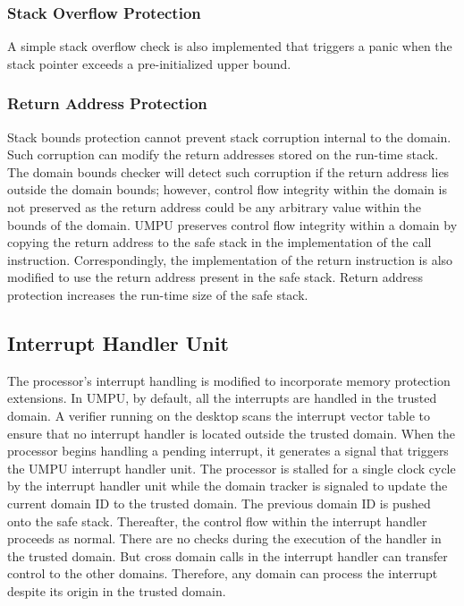 \subsubsection{Stack Overflow Protection}
A simple stack overflow check is also implemented that
triggers a panic when the stack pointer exceeds a pre-initialized
upper bound.
\subsubsection{Return Address Protection}
%
Stack bounds protection cannot prevent stack corruption internal to the domain.
%
Such corruption can modify the return addresses stored on the run-time stack.
%
The domain bounds checker will detect such corruption if the return address lies outside the domain bounds;
%
however, control flow integrity within the domain is not preserved as
the return address could be any arbitrary value within the bounds of
the domain.
%
UMPU preserves control flow integrity within a domain by copying the
return address to the safe stack in the implementation of the call
instruction.
%
Correspondingly, the implementation of the return instruction is also
modified to use the return address present in the safe stack.
%
Return address protection increases the run-time size of the safe stack.
%
\subsection{Interrupt Handler Unit}
\label{sec:umpuintr}
%
The processor's interrupt handling is modified to incorporate memory
protection extensions.
%
In UMPU, by default, all the interrupts are handled in the trusted domain.
%
A verifier running on the desktop scans the interrupt vector table to
ensure that no interrupt handler is located outside the trusted
domain.
%
When the processor begins handling a pending interrupt, it generates a
signal that triggers the UMPU interrupt handler unit.
%
The processor is stalled for a single clock cycle by the interrupt
handler unit while the domain tracker is signaled to update the current
domain ID to the trusted domain.
%
The previous domain ID is pushed onto the safe stack.
%
Thereafter, the control flow within the interrupt handler proceeds as
normal.
%
There are no checks during the execution of the handler in the trusted
domain.
%
But cross domain calls in the interrupt handler can transfer control
to the other domains.
%
Therefore, any domain can process the interrupt despite its origin in
the trusted domain.
%

